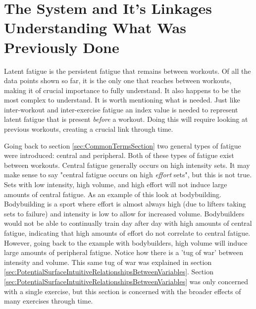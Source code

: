 \chapter{
	The System and It's Linkages
    \\
    \large{Understanding What Was Previously Done}
}
\label{sec:AugmentedDataLatentFatigue}



Latent fatigue is the persistent fatigue that remains between workouts. Of all the data points shown so far, it is the only one that reaches between workouts, making it of crucial importance to fully understand. It also happens to be the most complex to understand. It is worth mentioning what is needed. Just like inter-workout and inter-exercise fatigue an index value is needed to represent latent fatigue that is present \textit{before} a workout. Doing this will require looking at previous workouts, creating a crucial link through time.

Going back to section \ref{sec:CommonTermsSection} two general types of fatigue were introduced: central and peripheral. Both of these types of fatigue exist between workouts. Central fatigue generally occurs on high intensity sets. It may make sense to say "central fatigue occurs on high \textit{effort} sets", but this is not true. Sets with low intensity, high volume, and high effort will not induce large amounts of central fatigue. As an example of this look at bodybuilding. Bodybuilding is a sport where effort is almost always high (due to lifters taking sets to failure) and intensity is low to allow for increased volume. Bodybuilders would not be able to continually train day after day with high amounts of central fatigue, indicating that high amounts of effort do not correlate to central fatigue. However, going back to the example with bodybuilders, high volume will induce large amounts of peripheral fatigue. Notice how there is a 'tug of war' between intensity and volume. This same tug of war was explained in section \ref{sec:PotentialSurfaceIntuitiveRelationshipsBetweenVariables}. Section \ref{sec:PotentialSurfaceIntuitiveRelationshipsBetweenVariables} was only concerned with a single exercise, but this section is concerned with the broader effects of many exercises through time.

